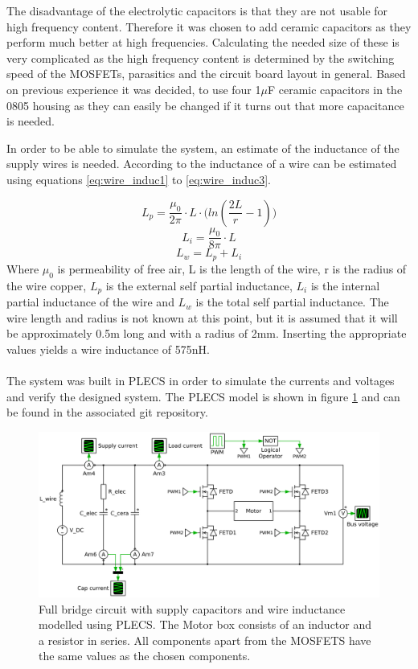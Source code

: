 The disadvantage of the electrolytic capacitors is that they are not usable for high frequency content.
Therefore it was chosen to add ceramic capacitors as they perform much better at high frequencies. 
Calculating the needed size of these is very complicated as the high frequency content is determined by the switching speed of the MOSFETs, parasitics and the circuit board layout in general. 
Based on previous experience it was decided, to use four 1$\mu$F ceramic capacitors in the 0805 housing as they can easily be changed if it turns out that more capacitance is needed.

In order to be able to simulate the system, an estimate of the inductance of the supply wires is needed.
According to \cite{partial_induc} the inductance of a wire can be estimated using equations \ref{eq:wire_induc1} to \ref{eq:wire_induc3}.

\begin{equation}
	L_p = \frac{\mu_0}{2 \pi} \cdot L \cdot \big(ln(\frac{2L}{r}-1)\big)
	\label{eq:wire_induc1}
\end{equation}
\begin{equation}
	L_i = \frac{\mu_0}{8 \pi} \cdot L
\end{equation}
\begin{equation}
	L_w = L_p + L_i
	\label{eq:wire_induc3}
\end{equation}
Where $\mu_0$ is permeability of free air, L is the length of the wire, r is the radius of the wire copper, $L_p$ is the external self partial inductance, $L_i$ is the internal partial inductance of the wire and $L_w$ is the total self partial inductance.
The wire length and radius is not known at this point, but it is assumed that it will be approximately 0.5m long and with a radius of 2mm. 
Inserting the appropriate values yields a wire inductance of 575nH.
\\~\\
The system was built in PLECS in order to simulate the currents and voltages and verify the designed system.
The PLECS model is shown in figure \ref{fig:plecs_schem} and can be found in the associated git repository.

\begin{figure}[h]
	\centering
	\includegraphics[width=1\linewidth]{graphics/plecs_schem.png}
	\caption[Full bridge circuit modelled in PLECS.]{Full bridge circuit with supply capacitors and wire inductance modelled using PLECS. The Motor box consists of an inductor and a resistor in series. All components apart from the MOSFETS have the same values as the chosen components.}
	\label{fig:plecs_schem}
\end{figure}	

